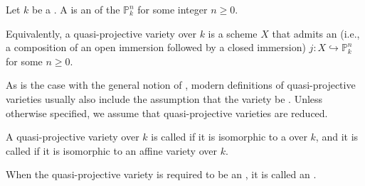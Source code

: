 \begin{definition} \label{definition:quasi_projective_variety_over_a_field}
Let $k$ be a . A  is an  of the  $\mathbb{P}^n_k$ for some integer $n \geq 0$.

Equivalently, a quasi-projective variety over $k$ is a scheme $X$ that admits an  (i.e., a composition of an open immersion followed by a closed immersion) $j: X \hookrightarrow \mathbb{P}^n_k$ for some $n \geq 0$.

As is the case with the general notion of , modern definitions of quasi-projective varieties usually also include the assumption that the variety be . Unless otherwise specified, we assume that quasi-projective varieties are reduced.




A quasi-projective variety over $k$ is called  if it is isomorphic to a  over $k$, and it is called  if it is isomorphic to an affine variety over $k$.

When the quasi-projective variety is required to be an , it is called an .
\end{definition}
